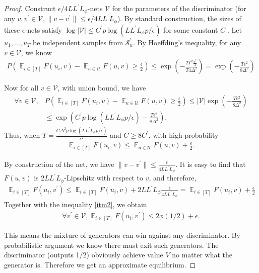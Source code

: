\documentclass[10pt,twocolumn,letterpaper]{article}
\newcommand{\Eb}{\mathbb{E}}
\newcommand{\U}{\mathcal{U}}
\newcommand{\V}{\mathcal{V}}
\begin{document}
\begin{proof}
	Construct $\epsilon/4LL^\prime L_\phi$-nets $\V$ for the parameters of the discriminator (for any $v, v^\prime \in \V, \|v-v^\prime\| \le \epsilon/4LL^\prime L_\phi$). By standard construction, the sizes of these $\epsilon$-nets satisfy $\log|\V| \le C^\prime p\log(LL^\prime L_\phi p/\epsilon) $ for some constant $C^\prime$. Let $u_1,\ldots,u_T$ be independent samples from $\mathcal{S}^\prime_u$. By Hoeffding's inequality, for any $v\in \V$, we know
	\begin{align}
	P(\mathop\Eb_{i\in[T]}F(u_i,v) -\mathop\Eb_{u\in \U }F(u,v) \ge \frac{\epsilon}{2} ) \le \exp \left(-\frac{2T^2\frac{\epsilon^2}{4}}{T4\Delta^2}\right) =\exp \left(-\frac{T\epsilon^2}{8\Delta^2}\right)
	\end{align}
	
	Now for all $v\in \V$, with union bound, we have
	\begin{align}
	\forall v \in \V,	&P(\mathop\Eb_{i\in[T]}F(u_i,v) -\mathop\Eb_{u\in \U }F(u,v) \ge \frac{\epsilon}{2} ) \le  |\V|\exp \left(-\frac{T\epsilon^2}{8\Delta^2}\right)\\
	& \le \exp \left(C^\prime p\log(LL^\prime L_\phi p/\epsilon)-\frac{T\epsilon^2}{8\Delta^2}\right).
	\end{align}
	Thus, when $T=\frac{C\Delta^2p\log(LL^\prime L_\phi p/\epsilon)}{\epsilon^2}$ and $C\ge 8C^\prime$, with high probability
	\begin{align}\label{itm2}
	\mathop\Eb_{i\in[T]}F(u_i,v) \le \mathop\Eb_{u\in \U }F(u,v) + \frac{\epsilon}{2} .
	\end{align}
	
	By construction of the net, we have $\|v-v^\prime\|\le \frac{\epsilon}{4LL^\prime L_\phi}$. 
	It is easy to find that $F(u,v)$ is $2LL^\prime L_\phi$-Lipschitz with respect to $v$, and therefore,
	\begin{align}
	\mathop\Eb_{i\in[T]}F(u_i,v^\prime) \le 	\mathop\Eb_{i\in[T]}F(u_i,v)+2LL^\prime L_\phi \frac{\epsilon}{4LL^\prime L_\phi} =\mathop\Eb_{i\in[T]}F(u_i,v)+ \frac{\epsilon}{2}
	\end{align}
	Together with the inequality \eqref{itm2}, we obtain 		\begin{align}
	\forall v^\prime \in \V,	\mathop\Eb_{i\in[T]}F(u_i,v^\prime) \le 2\phi(1/2)+\epsilon.
	\end{align}
	
	This means the mixture of generators can win against any discriminator. By probabilistic argument we know there must exit such generators. The discriminator (outputs 1/2) obviously achieve value $V$ no matter what the generator is. Therefore we get an approximate equilibrium.
\end{proof}
\end{document}
